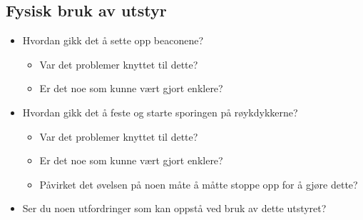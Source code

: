 \documentclass[../Main/thesis.tex]{subfiles}
\begin{document}
\subsection*{Fysisk bruk av utstyr}
\begin{itemize}
\item Hvordan gikk det å sette opp beaconene?
\begin{itemize}
	\item Var det problemer knyttet til dette?
	\item Er det noe som kunne vært gjort enklere?
	\end{itemize}
\item Hvordan gikk det å feste og starte sporingen på røykdykkerne?
\begin{itemize}
	\item Var det problemer knyttet til dette?
	\item Er det noe som kunne vært gjort enklere?
	\item Påvirket det øvelsen på noen måte å måtte stoppe opp for å gjøre dette?
	\end{itemize}
\item Ser du noen utfordringer som kan oppstå ved bruk av dette utstyret?
\end{itemize}
\end{document}
